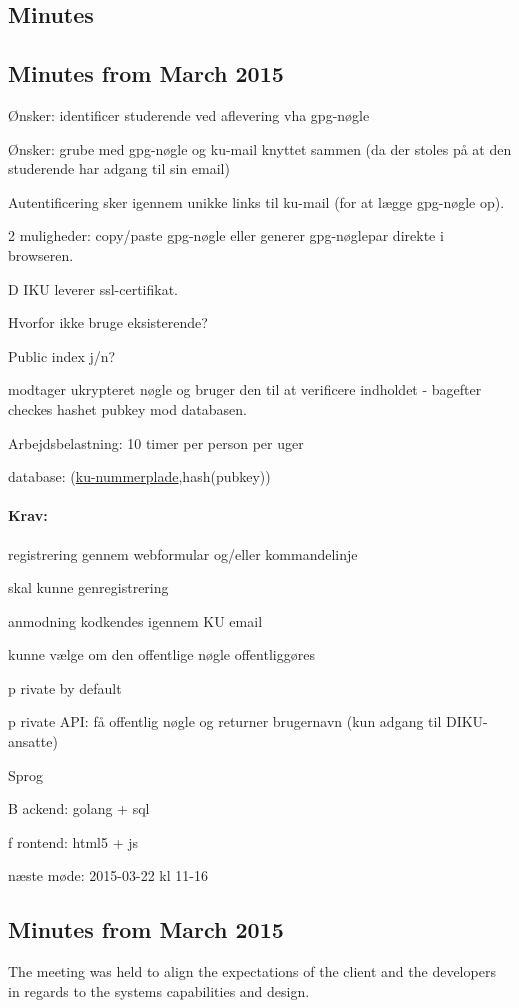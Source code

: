 \documentclass[11pt,a4paper]{report}
\let\OldItem\item
\newcommand{\SubItemStart}[1]{%
    \let\item\SubItemEnd
    \begin{SubItemList}[resume]%
        \OldItem #1%
}
\newcommand{\SubItemMiddle}[1]{%
    \OldItem #1%
}
\newcommand{\SubItemEnd}[1]{%
    \end{SubItemList}%
    \let\item\OldItem
    \item #1%
}
\newcommand*{\SubItem}[1]{%
    \let\SubItem\SubItemMiddle%
    \SubItemStart{#1}%
}%
\begin{document}
\begin{appendices}
\chapter{Minutes}
\section{Minutes from March  2015}
\begin{itemize}
\item Ønsker: identificer studerende ved aflevering vha gpg-nøgle
\item Ønsker: grube med gpg-nøgle og ku-mail knyttet sammen (da der stoles på at den studerende har adgang til sin email)
\item Autentificering sker igennem unikke links til ku-mail (for at lægge gpg-nøgle op).
\SubItem 2 muligheder: copy/paste gpg-nøgle eller generer gpg-nøglepar direkte i browseren.
\item DIKU leverer ssl-certifikat.
\item Hvorfor ikke bruge eksisterende?
\item Public index j/n?
\item modtager ukrypteret nøgle og bruger den til at verificere indholdet - bagefter checkes hashet pubkey mod databasen.
\item Arbejdsbelastning: 10 timer per person per uger
\item database: (\underline{ku-nummerplade},hash(pubkey))
\end{itemize}
\subsubsection{Krav:}
\begin{itemize}
\item registrering gennem webformular og/eller kommandelinje
\item skal kunne genregistrering
\item anmodning kodkendes igennem KU email
\item kunne vælge om den offentlige nøgle offentliggøres
\SubItem private by default
\item private API: få offentlig nøgle og returner brugernavn (kun adgang til DIKU-ansatte)
\item Sprog
\SubItem Backend: golang + sql
\SubItem frontend: html5 + js
\end{itemize}

næste møde:
2015-03-22 kl 11-16

\section{Minutes from March  2015}
The meeting was held to align the expectations of the client and the developers in regards to the systems capabilities and design.


\end{appendices}
\end{document}
